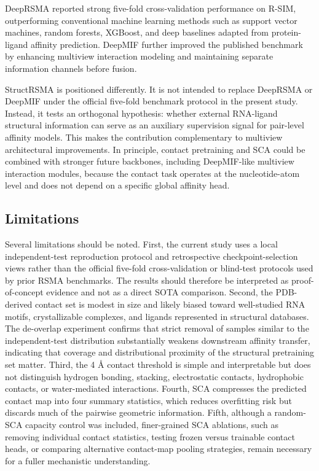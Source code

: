 \documentclass[journal=jcisd8,manuscript=article]{achemso}
\begin{document}
DeepRSMA reported strong five-fold cross-validation performance on R-SIM, outperforming conventional machine learning methods such as support vector machines, random forests, XGBoost, and deep baselines adapted from protein-ligand affinity prediction.\cite{Hearst1998SVM,Breiman2001RandomForests,Chen2016XGBoost,Abbasi2020DeepCDA,Wang2021DeepDTAF,Nguyen2021GraphDTA,Huang2024DeepRSMA} DeepMIF further improved the published benchmark by enhancing multiview interaction modeling and maintaining separate information channels before fusion.\cite{Song2026DeepMIF}

StructRSMA is positioned differently. It is not intended to replace DeepRSMA or DeepMIF under the official five-fold benchmark protocol in the present study. Instead, it tests an orthogonal hypothesis: whether external RNA-ligand structural information can serve as an auxiliary supervision signal for pair-level affinity models. This makes the contribution complementary to multiview architectural improvements. In principle, contact pretraining and SCA could be combined with stronger future backbones, including DeepMIF-like multiview interaction modules, because the contact task operates at the nucleotide-atom level and does not depend on a specific global affinity head.

\subsection{Limitations}

Several limitations should be noted. First, the current study uses a local independent-test reproduction protocol and retrospective checkpoint-selection views rather than the official five-fold cross-validation or blind-test protocols used by prior RSMA benchmarks. The results should therefore be interpreted as proof-of-concept evidence and not as a direct SOTA comparison. Second, the PDB-derived contact set is modest in size and likely biased toward well-studied RNA motifs, crystallizable complexes, and ligands represented in structural databases. The de-overlap experiment confirms that strict removal of samples similar to the independent-test distribution substantially weakens downstream affinity transfer, indicating that coverage and distributional proximity of the structural pretraining set matter. Third, the 4 \AA{} contact threshold is simple and interpretable but does not distinguish hydrogen bonding, stacking, electrostatic contacts, hydrophobic contacts, or water-mediated interactions. Fourth, SCA compresses the predicted contact map into four summary statistics, which reduces overfitting risk but discards much of the pairwise geometric information. Fifth, although a random-SCA capacity control was included, finer-grained SCA ablations, such as removing individual contact statistics, testing frozen versus trainable contact heads, or comparing alternative contact-map pooling strategies, remain necessary for a fuller mechanistic understanding.
\end{document}
